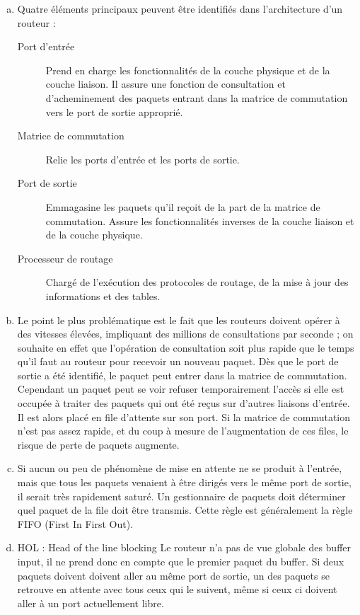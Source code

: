 \begin{enumerate}[(a)]
	\item Quatre éléments principaux peuvent être identifiés dans l’architecture d’un routeur :
	\begin{description}
		\item [Port d’entrée] Prend en charge les fonctionnalités de la couche physique et de la couche liaison. Il assure une fonction de consultation et d’acheminement des paquets entrant dans la matrice de commutation vers le port de sortie approprié.
		\item [Matrice de commutation] Relie les ports d’entrée et les ports de sortie.
		\item [Port de sortie] Emmagasine les paquets qu’il reçoit de la part de la matrice de commutation. Assure les fonctionnalités inverses de la couche liaison et de la couche physique.
		\item [Processeur de routage] Chargé de l’exécution des protocoles de routage, de la mise à jour des informations et des tables.
	\end{description}

	\item Le point le plus problématique est le fait que les routeurs doivent opérer à des vitesses élevées, impliquant des millions de consultations par seconde ; on souhaite en effet que l'opération de consultation soit plus rapide que le temps qu'il faut au routeur pour recevoir un nouveau paquet. Dès que le port de sortie a été identifié, le paquet peut entrer dans la matrice de commutation. Cependant un paquet peut se voir refuser temporairement l'accès si elle est occupée à traiter des paquets qui ont été reçus sur d'autres liaisons d'entrée. Il est alors placé en file d'attente sur son port. Si la matrice de commutation n'est pas assez rapide, et du coup à mesure de l'augmentation de ces files, le risque de perte de paquets augmente.

	\item Si aucun ou peu de phénomène de mise en attente ne se produit à l'entrée, mais que tous les paquets venaient à être dirigés vers le même port de sortie, il serait très rapidement saturé. Un gestionnaire de paquets doit déterminer quel paquet de la file doit être transmis. Cette règle est généralement la règle FIFO (First In First Out).

	\item HOL : Head of the line blocking Le routeur n’a pas de vue globale des buffer input, il ne prend donc en compte que le premier paquet du buffer. Si deux paquets doivent doivent aller au même port de sortie, un des paquets se retrouve en attente avec tous ceux qui le suivent, même si ceux ci doivent aller à un port actuellement libre.
\end{enumerate}
\color{black}







